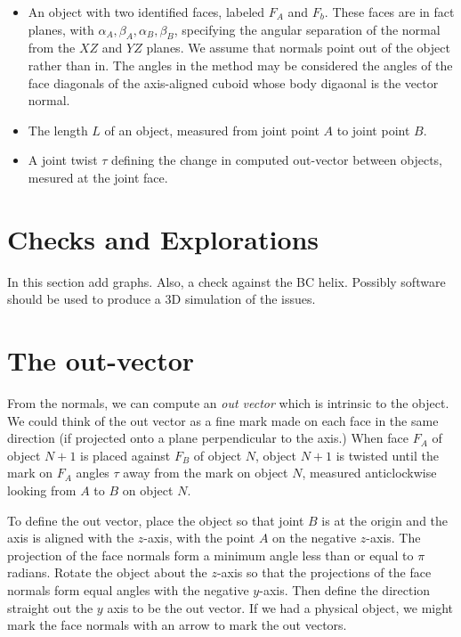 \documentclass[11pt]{article}
\begin{document}
{\begin{itemize}
\item An object with two identified faces, labeled $F_A$ and $F_b$. These faces are in
  fact planes, with $\alpha_A, \beta_A, \alpha_B, \beta_B$, specifying the
  angular separation of the normal from the $XZ$ and $YZ$ planes. We assume that normals point out
  of the object rather than in. The angles in the method may be considered the angles of the face diagonals of the axis-aligned cuboid whose body digaonal is the vector normal.
\item The length $L$ of an object, measured from joint point $A$ to joint point $B$.
\item A joint twist $\tau$ defining the change in computed out-vector between objects,
  mesured at the joint face.
\end{itemize}

\section{Checks and Explorations}

In this section add graphs. Also, a check against the BC helix.
Possibly software should be used to produce a 3D simulation
of the issues.

\section{The out-vector}

From the normals, we can compute an {\em out vector} which is intrinsic to the object.
We could think of the out vector as a fine mark made on each face in the same direction
(if projected onto a plane perpendicular to the axis.) When face $F_A$ of object $N+1$
is placed against $F_B$ of object $N$, object $N+1$ is twisted until the mark on $F_A$ angles
$\tau$ away from the mark on object $N$, measured anticlockwise looking from $A$ to $B$ on
object $N$.

To define the out vector, place the object so that joint $B$ is at the origin and the
axis is aligned with the $z$-axis, with the point $A$ on the negative $z$-axis.
The projection of the face normals form a minimum angle less than or equal to $\pi$
radians. Rotate the object about the $z$-axis so that the projections of the face normals
form equal angles with the negative $y$-axis. Then define the direction straight out
the $y$ axis to be the out vector. If we had a physical object, we might mark the face
normals with an arrow to mark the out vectors.

}
\end{document}
